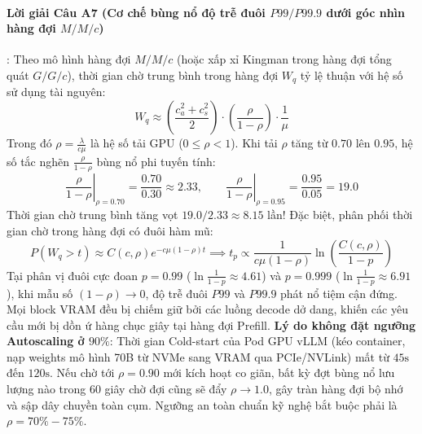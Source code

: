 \paragraph{Lời giải Câu A7 (Cơ chế bùng nổ độ trễ đuôi $P99/P99.9$ dưới góc nhìn hàng đợi $M/M/c$)}:
Theo mô hình hàng đợi $M/M/c$ (hoặc xấp xỉ Kingman trong hàng đợi tổng quát $G/G/c$), thời gian chờ trung bình trong hàng đợi $W_q$ tỷ lệ thuận với hệ số sử dụng tài nguyên:
\begin{equation*}
W_q \approx \left(\frac{c_a^2 + c_s^2}{2}\right) \cdot \left(\frac{\rho}{1 - \rho}\right) \cdot \frac{1}{\mu}
\end{equation*}
Trong đó $\rho = \frac{\lambda}{c \mu}$ là hệ số tải GPU ($0 \le \rho < 1$).
Khi tải $\rho$ tăng từ $0.70$ lên $0.95$, hệ số tắc nghẽn $\frac{\rho}{1 - \rho}$ bùng nổ phi tuyến tính:
\begin{equation*}
\left. \frac{\rho}{1 - \rho} \right|_{\rho=0.70} = \frac{0.70}{0.30} \approx 2.33, \qquad \left. \frac{\rho}{1 - \rho} \right|_{\rho=0.95} = \frac{0.95}{0.05} = 19.0
\end{equation*}
Thời gian chờ trung bình tăng vọt $19.0 / 2.33 \approx 8.15$ lần!
Đặc biệt, phân phối thời gian chờ trong hàng đợi có đuôi hàm mũ:
\begin{equation*}
P(W_q > t) \approx C(c, \rho) e^{-c\mu(1-\rho)t} \implies t_p \propto \frac{1}{c\mu(1-\rho)} \ln \left( \frac{C(c, \rho)}{1 - p} \right)
\end{equation*}
Tại phân vị đuôi cực đoan $p = 0.99$ ($\ln \frac{1}{1-p} \approx 4.61$) và $p = 0.999$ ($\ln \frac{1}{1-p} \approx 6.91$), khi mẫu số $(1-\rho) \to 0$, độ trễ đuôi $P99$ và $P99.9$ phát nổ tiệm cận đứng. Mọi block VRAM đều bị chiếm giữ bởi các luồng decode dở dang, khiến các yêu cầu mới bị dồn ứ hàng chục giây tại hàng đợi Prefill.
\textbf{Lý do không đặt ngưỡng Autoscaling ở $90\%$}: Thời gian Cold-start của Pod GPU vLLM (kéo container, nạp weights mô hình 70B từ NVMe sang VRAM qua PCIe/NVLink) mất từ $45\text{s}$ đến $120\text{s}$. Nếu chờ tới $\rho = 0.90$ mới kích hoạt co giãn, bất kỳ đợt bùng nổ lưu lượng nào trong 60 giây chờ đợi cũng sẽ đẩy $\rho \to 1.0$, gây tràn hàng đợi bộ nhớ và sập dây chuyền toàn cụm. Ngưỡng an toàn chuẩn kỹ nghệ bắt buộc phải là $\rho = 70\% - 75\%$.


